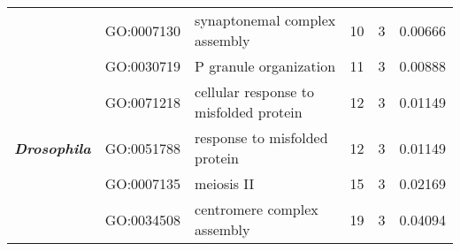 \begin{landscape}
\begin{longtable}[c]{@{}lllccr@{}}
		                                               & GO:0007130                         & synaptonemal complex assembly                                             & 10                                                                 & 3                                                                    & 0.00666                                                                                  \\
		\multirow{5}{*}{\textit{\textbf{Drosophila}}}  & GO:0030719                         & P granule organization                                                    & 11                                                                 & 3                                                                    & 0.00888                                                                                  \\
		                                               & GO:0071218                         & cellular response to misfolded protein                                    & 12                                                                 & 3                                                                    & 0.01149                                                                                  \\
		                                               & GO:0051788                         & response to misfolded protein                                             & 12                                                                 & 3                                                                    & 0.01149                                                                                  \\
		                                               & GO:0007135                         & meiosis II                                                                & 15                                                                 & 3                                                                    & 0.02169                                                                                  \\
		                                               & GO:0034508                         & centromere complex assembly                                               & 19                                                                 & 3                                                                    & 0.04094                                                                                  \\* \bottomrule \bottomrule
	\end{longtable}
\end{landscape}

